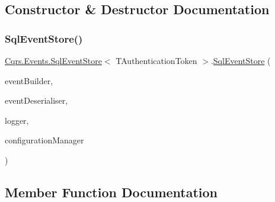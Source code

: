 \subsection{Constructor \& Destructor Documentation}
\mbox{\label{classCqrs_1_1Events_1_1SqlEventStore_a15df78a1b12d2e3035b9715e9bfc8535_a15df78a1b12d2e3035b9715e9bfc8535}} 
\subsubsection{\texorpdfstring{Sql\+Event\+Store()}{SqlEventStore()}}
{\footnotesize\ttfamily \hyperlink{classCqrs_1_1Events_1_1SqlEventStore}{Cqrs.\+Events.\+Sql\+Event\+Store}$<$ T\+Authentication\+Token $>$.\hyperlink{classCqrs_1_1Events_1_1SqlEventStore}{Sql\+Event\+Store} (\begin{DoxyParamCaption}\item[{\hyperlink{interfaceCqrs_1_1Events_1_1IEventBuilder}{I\+Event\+Builder}$<$ T\+Authentication\+Token $>$}]{event\+Builder,  }\item[{\hyperlink{interfaceCqrs_1_1Events_1_1IEventDeserialiser}{I\+Event\+Deserialiser}$<$ T\+Authentication\+Token $>$}]{event\+Deserialiser,  }\item[{I\+Logger}]{logger,  }\item[{\hyperlink{interfaceCqrs_1_1Configuration_1_1IConfigurationManager}{I\+Configuration\+Manager}}]{configuration\+Manager }\end{DoxyParamCaption})}



\subsection{Member Function Documentation}
\mbox{\label{classCqrs_1_1Events_1_1SqlEventStore_a94ce64c00db57e5b9dbd10f74a4cef5b_a94ce64c00db57e5b9dbd10f74a4cef5b}} 
